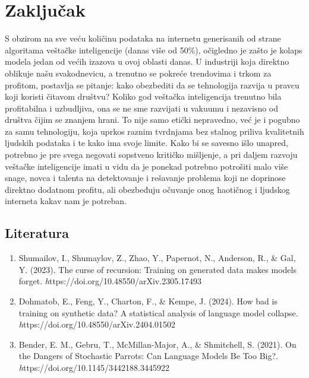 \documentclass[12pt]{article}
\begin{document}
	\section{Zaključak}
	S obzirom na sve veću količinu podataka na internetu generisanih od strane algoritama veštačke inteligencije (danas više od 50\%), očigledno je zašto je kolaps modela jedan od većih izazova u ovoj oblasti danas. U industriji koja direktno oblikuje našu svakodnevicu, a trenutno se pokreće trendovima i trkom za profitom, postavlja se pitanje: kako obezbediti da se tehnologija razvija u pravcu koji koristi čitavom društvu? Koliko god veštačka inteligencija trenutno bila profitabilna i uzbudljiva, ona se ne sme razvijati u vakuumu i nezavisno od društva čijim se znanjem hrani. To nije samo etički nepravedno, već je i pogubno za samu tehnologiju, koja uprkos raznim tvrdnjama bez stalnog priliva kvalitetnih ljudskih podataka i te kako ima svoje limite. Kako bi se savesno išlo unapred, potrebno je pre svega negovati sopstveno kritičko mišljenje, a pri daljem razvoju veštačke inteligencije imati u vidu da je ponekad potrebno potrošiti malo više snage, novca i talenta na detektovanje i rešavanje problema koji ne doprinose direktno dodatnom profitu, ali obezbeđuju očuvanje onog haotičnog i ljudskog interneta kakav nam je potreban.
	
	\newpage
	\subsection*{Literatura}
	
	\begin{enumerate}
    \item Shumailov, I., Shumaylov, Z., Zhao, Y., Papernot, N., Anderson, R., \& Gal, Y. (2023). The curse of recursion: Training on generated data makes models forget. \textit https://doi.org/10.48550/arXiv.2305.17493
    \item Dohmatob, E., Feng, Y., Charton, F., \& Kempe, J. (2024). How bad is training on synthetic data? A statistical analysis of language model collapse. \textit https://doi.org/10.48550/arXiv.2404.01502
    \item Bender, E. M., Gebru, T., McMillan-Major, A., \& Shmitchell, S. (2021). On the Dangers of Stochastic Parrots: Can Language Models Be Too Big?. \textit https://doi.org/10.1145/3442188.3445922
    \end{enumerate}
	
\end{document}
